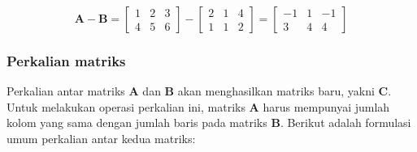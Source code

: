 \begin{equation*}
    \mathbf{A} - \mathbf{B} = \begin{bmatrix}1 & 2 & 3 \\ 4 & 5 & 6\end{bmatrix} - \begin{bmatrix}2 & 1 & 4\\ 1 & 1 & 2\end{bmatrix} = \begin{bmatrix}-1 & 1 & -1 \\ 3 & 4 & 4\end{bmatrix}
\end{equation*}

\subsubsection{Perkalian matriks}
Perkalian antar matriks $\mathbf{A}$ dan $\mathbf{B}$ akan menghasilkan matriks baru, yakni $\mathbf{C}$. Untuk melakukan operasi perkalian ini, matriks $\mathbf{A}$ harus mempunyai jumlah kolom yang sama dengan jumlah baris pada matriks $\mathbf{B}$. Berikut adalah formulasi umum perkalian antar kedua matriks:

